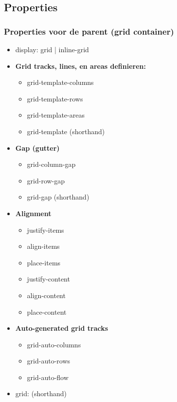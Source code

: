 \documentclass{article}
\newcommand{\bold}[1]{\textbf{#1}}
\begin{document}
\subsection{Properties}

\subsubsection{Properties voor de parent (grid container)}

\begin{itemize}
    \item display: grid | inline-grid
    \item \bold{Grid tracks, lines, en areas definieren: }
    \begin{itemize}
        \item grid-template-columns
        \item grid-template-rows
        \item grid-template-areas
        \item grid-template (shorthand)
    \end{itemize}
    \item \bold{Gap (gutter)}
    \begin{itemize}
        \item grid-column-gap
        \item grid-row-gap
        \item grid-gap (shorthand)
    \end{itemize}
    \item \bold{Alignment}
    \begin{itemize}
        \item justify-items
        \item align-items
        \item place-items
        \item justify-content
        \item align-content
        \item place-content
    \end{itemize}
    \item \bold{Auto-generated grid tracks}
    \begin{itemize}
        \item grid-auto-columns
        \item grid-auto-rows
        \item grid-auto-flow
    \end{itemize}
    \item grid: (shorthand)
\end{itemize}
\end{document}
